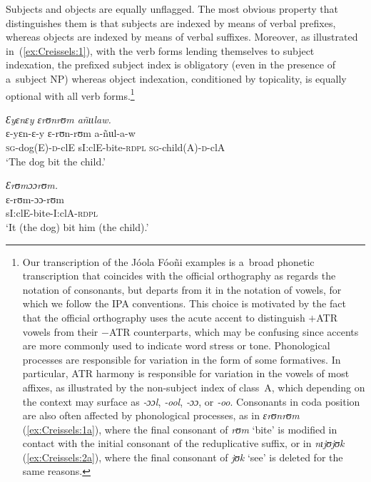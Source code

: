 \documentclass[output=paper]{langscibook}
\begin{document}
Subjects and objects are equally unflagged.  The most obvious property that distinguishes them is that subjects are indexed by means of verbal prefixes, whereas objects are indexed by means of verbal suffixes.  Moreover, as illustrated in~(\ref{ex:Creissels:1}), with the verb forms lending themselves to subject indexation, the prefixed subject index is obligatory (even in the presence of a~subject NP) whereas object indexation, conditioned by topicality, is equally optional with all verb forms.\footnote{ Our transcription of the Jóola Fóoñi examples is a~broad phonetic transcription that coincides with the official orthography as regards the notation of consonants, but departs from it in the notation of vowels, for which we follow the IPA conventions.
This choice is motivated by the fact that the official orthography uses the
  acute accent to distinguish $+$ATR vowels from their $-$ATR counterparts,
  which may be confusing since accents are more commonly used to indicate word
  stress or tone.  Phonological processes are responsible for variation in the
  form of some formatives.  In particular, ATR harmony is responsible for
  variation in the vowels of most affixes, as illustrated by the non-subject
  index of class~A, which depending on the context may surface as \textit{‑ɔɔl},
  \textit{‑ool}, \textit{‑ɔɔ}, or \textit{‑oo}.  Consonants in coda position are also
  often affected by phonological processes, as in \textit{εrʊnrʊm}
  (\ref{ex:Creissels:1a}), where the final consonant of \textit{rʊm} `bite' is modified
  in contact with the initial consonant of the reduplicative suffix, or in
  \textit{nιjʊjʊk} (\ref{ex:Creissels:2a}), where the final consonant of \textit{jʊk}
  `see' is deleted for the same reasons. }

\ea \label{ex:Creissels:1}
  
    \ea\label{ex:Creissels:1a}
    
      \textit{Ɛyɛnɛy ɛrʊnrʊm añɩɩlaw.} \\
      \gll ɛ-yɛn-ɛ-y ɛ-rʊn-rʊm a-ñɩɩl-a-w \\
      \textsc{sg}-dog(E)-\textsc{d}-clE sI:clE-bite-\textsc{rdpl} \textsc{sg}-child(A)-\textsc{d}-clA \\
      \glt `The dog bit the child.'


    \ex\label{ex:Creissels:1b}
    
      \textit{Ɛrʊmɔɔrʊm.} \\
      \gll ɛ-rʊm-ɔɔ-rʊm\\
      sI:clE-bite-I:clA-\textsc{rdpl}\\
      \glt `It (the dog) bit him (the child).'
\end{document}
